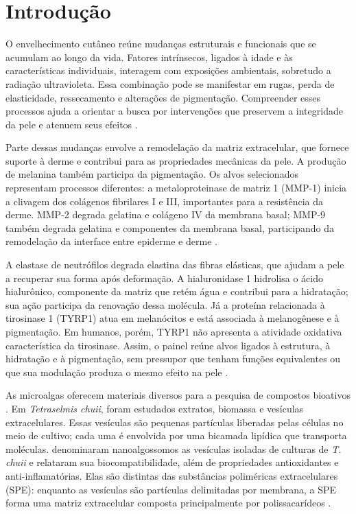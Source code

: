 \section{Introdução}
O envelhecimento cutâneo reúne mudanças estruturais e funcionais que se acumulam ao longo da vida. Fatores intrínsecos, ligados à idade e às características individuais, interagem com exposições ambientais, sobretudo a radiação ultravioleta. Essa combinação pode se manifestar em rugas, perda de elasticidade, ressecamento e alterações de pigmentação. Compreender esses processos ajuda a orientar a busca por intervenções que preservem a integridade da pele e atenuem seus efeitos \parencite{liu2023,papaccio2022}.

Parte dessas mudanças envolve a remodelação da matriz extracelular, que fornece suporte à derme e contribui para as propriedades mecânicas da pele. A produção de melanina também participa da pigmentação. Os alvos selecionados representam processos diferentes: a metaloproteinase de matriz 1 (MMP-1) inicia a clivagem dos colágenos fibrilares I e III, importantes para a resistência da derme. MMP-2 degrada gelatina e colágeno IV da membrana basal; MMP-9 também degrada gelatina e componentes da membrana basal, participando da remodelação da interface entre epiderme e derme \parencite{liu2025,papaccio2022}.

A elastase de neutrófilos degrada elastina das fibras elásticas, que ajudam a pele a recuperar sua forma após deformação. A hialuronidase 1 hidrolisa o ácido hialurônico, componente da matriz que retém água e contribui para a hidratação; sua ação participa da renovação dessa molécula. Já a proteína relacionada à tirosinase 1 (TYRP1) atua em melanócitos e está associada à melanogênese e à pigmentação. Em humanos, porém, TYRP1 não apresenta a atividade oxidativa característica da tirosinase. Assim, o painel reúne alvos ligados à estrutura, à hidratação e à pigmentação, sem pressupor que tenham funções equivalentes ou que sua modulação produza o mesmo efeito na pele \parencite{papaccio2022,chao2007,lai2017,liu2025,macdonald2002}.

As microalgas oferecem materiais diversos para a pesquisa de compostos bioativos \parencite{khemiri2023}. Em \textit{Tetraselmis chuii}, foram estudados extratos, biomassa e vesículas extracelulares. Essas vesículas são pequenas partículas liberadas pelas células no meio de cultivo; cada uma é envolvida por uma bicamada lipídica que transporta moléculas. \textcite{adamo2024} denominaram nanoalgossomos as vesículas isoladas de culturas de \textit{T. chuii} e relataram sua biocompatibilidade, além de propriedades antioxidantes e anti-inflamatórias. Elas são distintas das substâncias poliméricas extracelulares (SPE): enquanto as vesículas são partículas delimitadas por membrana, a SPE forma uma matriz extracelular composta principalmente por polissacarídeos \parencite{delattre2016}.

